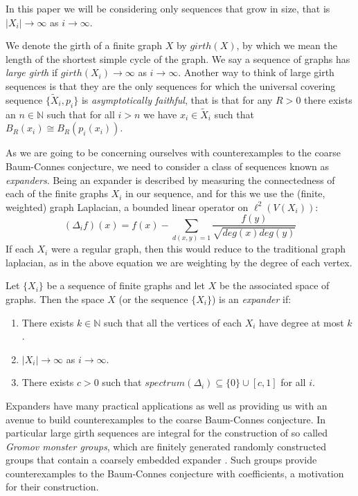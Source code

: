 In this paper we will be considering only sequences that grow in size, that is $\vert X_{i} \vert \rightarrow \infty$ as $i \rightarrow \infty$. 

We denote the girth of a finite graph $X$ by $girth(X)$, by which we mean the length of the shortest simple cycle of the graph. We say a sequence of graphs has \textit{large girth} if $girth(X_{i})\rightarrow \infty$ as $i\rightarrow \infty$. Another way to think of large girth sequences is that they are the only sequences for which the universal covering sequence $\lbrace \tilde{X}_{i}, p_{i} \rbrace$ is \textit{asymptotically faithful}, that is that for any $R>0$ there exists an $n \in \mathbb{N}$ such that for all $i > n$ we have $x_{i} \in \tilde{X}_{i}$ such that $B_{R}(x_{i}) \cong B_{R}(p_{i}(x_{i}))$.

As we are going to be concerning ourselves with counterexamples to the coarse Baum-Connes conjecture, we need to consider a class of sequences known as \textit{expanders}. Being an expander is described by measuring the connectedness of each of the finite graphs $X_{i}$ in our sequence, and for this we use the (finite, weighted) graph Laplacian, a bounded linear operator on $\ell^{2}(V(X_{i}))$:
\begin{equation*}
(\Delta_{i}f)(x)= f(x) - \sum_{d(x,y)=1}\frac{f(y)}{\sqrt{deg(x)deg(y)}}
\end{equation*}
If each $X_{i}$ were a regular graph, then this would reduce to the traditional graph laplacian, as in the above equation we are weighting by the degree of each vertex.

\begin{definition}
Let $\lbrace X_{i} \rbrace$ be a sequence of finite graphs and let $X$ be the associated space of graphs. Then the space $X$ (or the sequence $\lbrace X_{i} \rbrace$) is an \textit{expander} if:
\begin{enumerate}
\item There exists $k\in \mathbb{N}$ such that all the vertices of each $X_{i}$ have degree at most $k$.
\item $\vert X_{i} \vert \rightarrow \infty$ as $i\rightarrow \infty$.
\item There exists $c>0$ such that $spectrum(\Delta_{i})\subseteq \lbrace 0 \rbrace \cup [c,1]$ for all $i$.
\end{enumerate}
\end{definition}

Expanders have many practical applications as well as providing us with an avenue to build counterexamples to the coarse Baum-Connes conjecture. In particular large girth sequences are integral for the construction of so called \textit{Gromov monster groups}, which are finitely generated randomly constructed groups that contain a coarsely embedded expander \cite{MR1978492,exrangrps}. Such groups provide counterexamples to the Baum-Connes conjecture with coefficients, a motivation for their construction.

